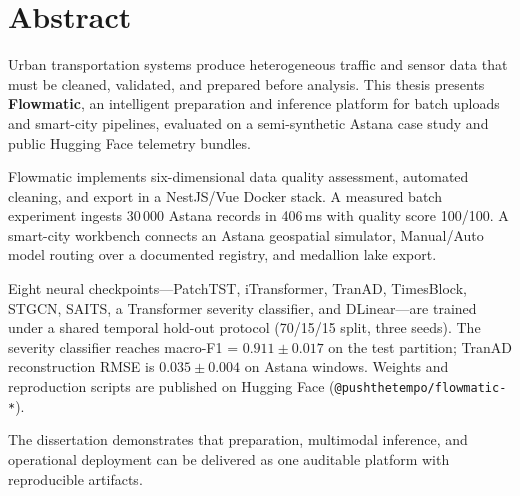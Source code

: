 %
%
\chapter{Abstract}
\begin{SingleSpace}
Urban transportation systems produce heterogeneous traffic and sensor data that must be cleaned, validated, and prepared before analysis. This thesis presents \textbf{Flowmatic}, an intelligent preparation and inference platform for batch uploads and smart-city pipelines, evaluated on a semi-synthetic Astana case study and public Hugging Face telemetry bundles.

Flowmatic implements six-dimensional data quality assessment, automated cleaning, and export in a NestJS/Vue Docker stack. A measured batch experiment ingests 30\,000 Astana records in 406\,ms with quality score 100/100. A smart-city workbench connects an Astana geospatial simulator, Manual/Auto model routing over a documented registry, and medallion lake export.

Eight neural checkpoints---PatchTST, iTransformer, TranAD, TimesBlock, STGCN, SAITS, a Transformer severity classifier, and DLinear---are trained under a shared temporal hold-out protocol (70/15/15 split, three seeds). The severity classifier reaches macro-F1 = $0.911 \pm 0.017$ on the test partition; TranAD reconstruction RMSE is $0.035 \pm 0.004$ on Astana windows. Weights and reproduction scripts are published on Hugging Face (\texttt{@pushthetempo/flowmatic-*}).

The dissertation demonstrates that preparation, multimodal inference, and operational deployment can be delivered as one auditable platform with reproducible artifacts.

\end{SingleSpace}

